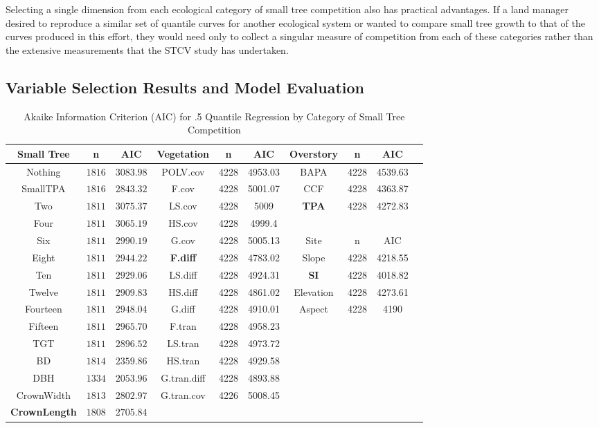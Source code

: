 \documentclass[11pt, letterpaper, fleqn]{article}
\begin{document}
Selecting a single dimension from each ecological category of small tree competition also has practical advantages.  If a land manager desired to reproduce a similar set of quantile curves for another ecological system or wanted to compare small tree growth to that of the curves produced in this effort, they would need only to collect a singular measure of competition from each of these categories rather than the extensive measurements that the STCV study has undertaken.






\newpage
\subsection{Variable Selection Results and Model Evaluation}

\begin{table}[h]
\small
\caption{Akaike Information Criterion (AIC) for .5 Quantile Regression by Category of Small Tree Competition  }
\begin{center}
\begin{tabular}{cccccccccc}
\hline\hline
{Small Tree}&{n}&{AIC}&
{Vegetation}&{n}&{AIC}&
{Overstory}&{n}&{AIC}&
\\


\hline
Nothing&$1816$&$3083.98$&POLV.cov&4228&4953.03&BAPA&4228&4539.63\tabularnewline
SmallTPA&$1816$&$2843.32$&F.cov&4228&5001.07&CCF&4228&4363.87\tabularnewline
Two&$1811$&$3075.37$&LS.cov&4228&5009&\textbf{TPA}&4228&4272.83\tabularnewline
Four&$1811$&$3065.19$&HS.cov&4228&4999.4&&&\tabularnewline
Six&$1811$&$2990.19$&G.cov&4228&5005.13&Site&n&AIC\tabularnewline
Eight&$1811$&$2944.22$&\textbf{F.diff}&4228&4783.02&Slope&4228&4218.55\tabularnewline
Ten&$1811$&$2929.06$&LS.diff&4228&4924.31&\textbf{SI}&4228&4018.82\tabularnewline
Twelve&$1811$&$2909.83$&HS.diff&4228&4861.02&Elevation&4228&4273.61\tabularnewline
Fourteen&$1811$&$2948.04$&G.diff&4228&4910.01&Aspect&4228&4190\tabularnewline
Fifteen&$1811$&$2965.70$&F.tran&4228&4958.23&&&\tabularnewline
TGT&$1811$&$2896.52$&LS.tran&4228&4973.72&&&\tabularnewline
BD&$1814$&$2359.86$&HS.tran&4228&4929.58&&&\tabularnewline
DBH&$1334$&$2053.96$&G.tran.diff&4228&4893.88&&&\tabularnewline
CrownWidth&$1813$&$2802.97$&G.tran.cov&4226&5008.45&&&\tabularnewline
\textbf{CrownLength}&$1808$&$2705.84$&&&&&&\tabularnewline



\hline
\end{tabular}
\end{center}
\label{tab:dum1}
\end{table}
\end{document}
